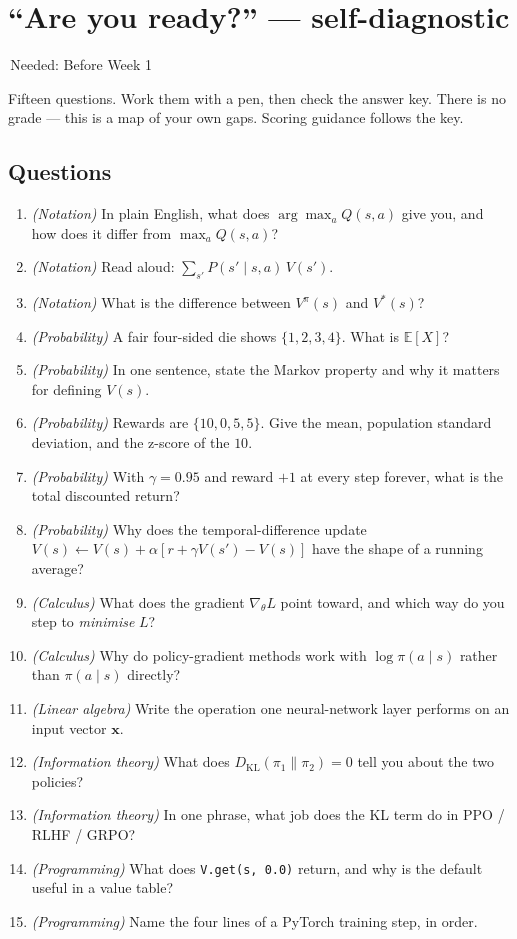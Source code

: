 \documentclass[11pt]{article}
\newcommand{\wk}[1]{{\sffamily\footnotesize\colorbox{slate!12}{\textcolor{slate}{\,Needed: #1\,}}}}
\begin{document}
\newpage
\section{``Are you ready?'' — self-diagnostic}
\wk{Before Week 1}

\vspace{0.4em}
Fifteen questions. Work them with a pen, then check the answer key. There is no grade — this is a map of your own gaps. Scoring guidance follows the key.

\subsection*{Questions}
\begin{enumerate}[label=\textbf{Q\arabic*.}]
\item \textit{(Notation)} In plain English, what does $\arg\max_a Q(s,a)$ give you, and how does it differ from $\max_a Q(s,a)$?
\item \textit{(Notation)} Read aloud: $\sum_{s'} P(s'\mid s,a)\,V(s')$.
\item \textit{(Notation)} What is the difference between $V^\pi(s)$ and $V^*(s)$?
\item \textit{(Probability)} A fair four-sided die shows $\{1,2,3,4\}$. What is $\mathbb{E}[X]$?
\item \textit{(Probability)} In one sentence, state the Markov property and why it matters for defining $V(s)$.
\item \textit{(Probability)} Rewards are $\{10, 0, 5, 5\}$. Give the mean, population standard deviation, and the z-score of the $10$.
\item \textit{(Probability)} With $\gamma=0.95$ and reward $+1$ at every step forever, what is the total discounted return?
\item \textit{(Probability)} Why does the temporal-difference update $V(s) \leftarrow V(s) + \alpha[r+\gamma V(s') - V(s)]$ have the shape of a running average?
\item \textit{(Calculus)} What does the gradient $\nabla_\theta L$ point toward, and which way do you step to \emph{minimise} $L$?
\item \textit{(Calculus)} Why do policy-gradient methods work with $\log \pi(a\mid s)$ rather than $\pi(a\mid s)$ directly?
\item \textit{(Linear algebra)} Write the operation one neural-network layer performs on an input vector $\mathbf{x}$.
\item \textit{(Information theory)} What does $D_{\mathrm{KL}}(\pi_1\|\pi_2)=0$ tell you about the two policies?
\item \textit{(Information theory)} In one phrase, what job does the KL term do in PPO / RLHF / GRPO?
\item \textit{(Programming)} What does \texttt{V.get(s, 0.0)} return, and why is the default useful in a value table?
\item \textit{(Programming)} Name the four lines of a PyTorch training step, in order.
\end{enumerate}
\end{document}
